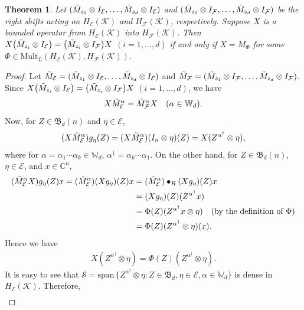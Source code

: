 \documentclass[12pt]{amsart}%
\newtheorem{theorem}{Theorem}[section]
\numberwithin{equation}{section}
\newcommand{\fB}{{\mathfrak{B}}}
\newcommand{\cle}{\mathcal{E}}
\newcommand{\clf}{\mathcal{F}}
\newcommand{\clk}{\mathcal{K}}
\newcommand{\cls}{\mathcal{S}}
\newcommand{\C}{\mathbb{C}}
\begin{document}
\begin{theorem}\label{intertwiner of right shifts}
Let $(\Tilde{M}_{z_1} \otimes I_{\cle}, \ldots, \Tilde{M}_{z_d}\otimes I_{\cle})$ and $(\Tilde{M}_{z_1} \otimes I_{\clf}, \ldots, \Tilde{M}_{z_d}\otimes I_{\clf})$ be the right shifts acting on $H_\cle(\clk)$ and $H_\clf(\clk)$, respectively. Suppose $X$ is a bounded operator from $H_\cle(\clk)$ into $H_\clf(\clk)$. Then $X \big (\Tilde{M}_{z_i} \otimes I_{\cle}\big)= \big(\Tilde{M}_{z_i} \otimes I_{\clf}\big) X$ $(i=1, \ldots, d)$ if and only if $X=M_\Phi$ for some $\Phi\in \text{Mult}_L(H_\cle(\clk), H_\clf(\clk))$.
\end{theorem}
\begin{proof}
Let $\Tilde{M}_\cle=(\Tilde{M}_{z_1} \otimes I_{\cle}, \ldots, \Tilde{M}_{z_d}\otimes I_{\cle})$ and $\Tilde{M}_\clf=(\Tilde{M}_{z_1} \otimes I_{\clf}, \ldots, \Tilde{M}_{z_d}\otimes I_{\clf})$. Since $X \big (\Tilde{M}_{z_i} \otimes I_{\cle}\big)= \big(\Tilde{M}_{z_i} \otimes I_{\clf}\big) X$ $(i=1, \ldots, d)$, we have 
\begin{align*}
X \Tilde{M}^\alpha_\cle=\Tilde{M}^\alpha_\clf X\quad (\alpha\in \mathbb{W}_d).
\end{align*}
Now, for $Z\in\fB_d(n)$ and $\eta\in \cle$,
\begin{align*}
(X \Tilde{M}^\alpha_\cle) g_\eta(Z)=(X \Tilde{M}^\alpha_\cle) (I_n\otimes \eta)(Z)=X (Z^{\alpha^\dag} \otimes \eta),
\end{align*}
where for $\alpha=\alpha_1\cdots \alpha_k\in \mathbb{W}_d$, $\alpha^\dag=\alpha_k\cdots \alpha_1$.
On the other hand, for $Z\in\fB_d(n)$, $\eta\in \cle$, and $x\in \C^n$,
\begin{align*}
(\Tilde{M}^\alpha_\cle X) g_\eta(Z)x=(\Tilde{M}^\alpha_\cle) (X g_\eta)(Z)x
&=(\Tilde{M}^\alpha_\cle)\bullet_R (Xg_\eta)(Z)x\\
&=(Xg_\eta)(Z) (Z^{\alpha^{\dag}} x)\\
&=\Phi(Z)(Z^{\alpha^{\dag}} x \otimes \eta)\quad (\text{by the definition of $\Phi$})\\
&=\Phi(Z)(Z^{\alpha^{\dag}}  \otimes \eta)(x).
\end{align*}
Hence we have 
\begin{align}\label{qual_X}
X(Z^{\alpha^{\dag}} \otimes\eta)=\Phi(Z)(Z^{\alpha^{\dag}}  \otimes \eta).
\end{align}
 It is easy to see that $\cls=\text{span}\, \{Z^{\alpha^{\dag}}\otimes\eta : Z\in\fB_d, \eta\in \cle, \alpha\in \mathbb{W}_d\}$ is dense in $H_\cle(\clk)$. Therefore,
\begin{align}\label{qual_X_S}

\end{align}
\end{proof}
\end{document}
